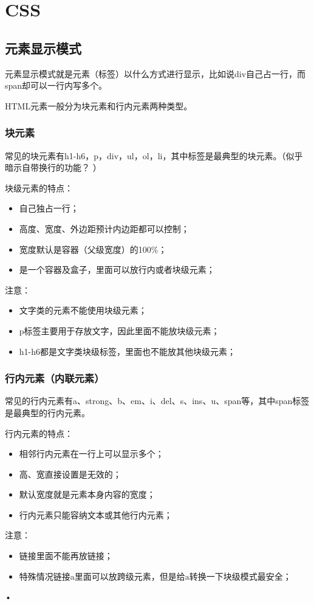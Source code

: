 \chapter{CSS}
\section{元素显示模式}
元素显示模式就是元素（标签）以什么方式进行显示，比如说div自己占一行，而span却可以一行内写多个。

HTML元素一般分为块元素和行内元素两种类型。

\subsection{块元素}
常见的块元素有h1-h6，p，div，ul，ol，li，其中标签是最典型的块元素。（似乎暗示自带换行的功能？ ）

块级元素的特点：
\begin{itemize}
\item 自己独占一行；
\item 高度、宽度、外边距预计内边距都可以控制；

\item 宽度默认是容器（父级宽度）的100\%；

\item 是一个容器及盒子，里面可以放行内或者块级元素；
\end{itemize}

注意：
\begin{itemize}
\item 文字类的元素不能使用块级元素；
\item p标签主要用于存放文字，因此里面不能放块级元素；
\item h1-h6都是文字类块级标签，里面也不能放其他块级元素；
\end{itemize}
\subsection{行内元素（内联元素）}
常见的行内元素有a、strong、b、em、i、del、s、ins、u、span等，其中span标签是最典型的行内元素。

行内元素的特点：
\begin{itemize}
\item 相邻行内元素在一行上可以显示多个；
\item 高、宽直接设置是无效的；
\item 默认宽度就是元素本身内容的宽度；
\item 行内元素只能容纳文本或其他行内元素；

\end{itemize}
注意：
\begin{itemize}
\item 链接里面不能再放链接；
\item 特殊情况链接a里面可以放跨级元素，但是给a转换一下块级模式最安全；


\end{itemize}•

